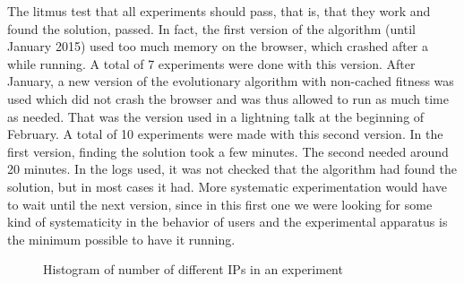 \documentclass{sig-alternate}
\begin{document}
The litmus test that all experiments should pass, that is, that they
work and found the solution, passed. In fact, the first version of the
algorithm (until January 2015) used too much memory on the browser,
which crashed after a while running. A total of 7 experiments were
done with this version. After January, a new version of the
evolutionary algorithm with non-cached fitness was used which did not
crash the browser and was thus allowed to run as much time as
needed. That was the version used in a lightning talk at the beginning
of February. A total of 10 experiments were made with this second
version. In the first version, finding the solution took a few
minutes. The second needed around 20 minutes. In the logs used, it was
not checked that the algorithm had found the solution, but in most
cases it had. More systematic experimentation would have to wait until
the next version, since in this first one we were looking for some
kind of systematicity in the behavior of users and the experimental
apparatus is the minimum possible to have it running.
%
\begin{figure}[htb]
        \centering
        \caption{Histogram of number of different IPs in an experiment}\label{fig:histo:ips}
\end{figure}
\end{document}
